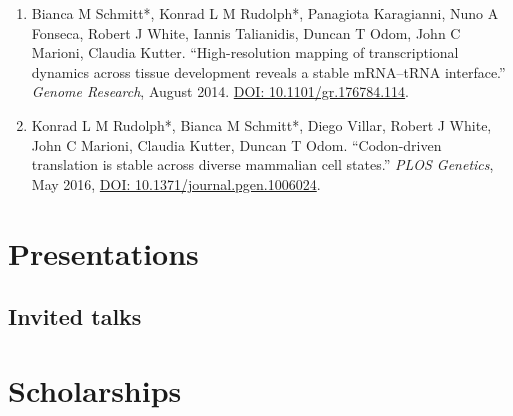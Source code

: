 \documentclass{klmr-cv}
\begin{document}

\begin{enumerate}
    \item Bianca M Schmitt*, Konrad L M Rudolph*, Panagiota Karagianni,
        Nuno A Fonseca, Robert J White, Iannis Talianidis, Duncan T Odom,
        John C Marioni, Claudia Kutter. “High-resolution mapping of
        transcriptional dynamics across tissue development reveals a stable
        mRNA--tRNA interface.” \textit{Genome Research}, August 2014.
        \href{http://dx.doi.org/10.1101/gr.176784.114}{DOI:
        10.1101/gr.176784.114}.

    \item Konrad L M Rudolph*, Bianca M Schmitt*, Diego Villar, Robert J
        White, John C Marioni, Claudia Kutter, Duncan T Odom. “Codon-driven
        translation is stable across diverse mammalian cell states.”
        \textit{PLOS Genetics}, May 2016,
        \href{http://dx.doi.org/10.1371/journal.pgen.1006024}{DOI:
        10.1371/journal.pgen.1006024}.
\end{enumerate}

\section{Presentations}

\subsection{Invited talks}

\section{Scholarships}
\end{document}
